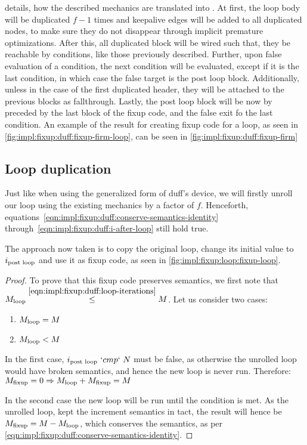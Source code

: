  details, how the described mechanics are translated into \libFIRM.
At first, the loop body will be duplicated $f - 1$ times and keepalive edges will be added to all duplicated nodes, to make sure they do not disappear through implicit premature optimizations.
After this, all duplicated block will be wired such that, they be reachable by conditions, like those previously described.
Further, upon false evaluation of a condition, the next condition will be evaluated, except if it is the last condition, in which case the false target is the post loop block.
Additionally, unless in the case of the first duplicated header, they will be attached to the previous blocks as fallthrough.
Lastly, the post loop block will be now by preceded by the last block of the fixup code, and the false exit fo the last condition.
An example of the result for creating fixup code for a loop, as seen in \cref{fig:impl:fixup:duff:fixup-firm-loop}, can be seen in \cref{fig:impl:fixup:duff:fixup-firm}







\subsection{Loop duplication}\label{sec:impl:fixup:loop}

Just like when using the generalized form of duff's device, we will firstly unroll our loop using the existing mechanics by a factor of $f$.
Henceforth, equations~\ref{eqn:impl:fixup:duff:conserve-semantics-identity} through~\ref{eqn:impl:fixup:duff:i-after-loop} still hold true.

The approach now taken is to copy the original loop, change its initial value to $i_\text{post loop}$ and use it as fixup code, as seen in \cref{fig:impl:fixup:loop:fixup-loop}.



\begin{proof}
    To prove that this fixup code preserves semantics, we first note that $M_{\text{loop}} \overset{\ref{eqn:impl:fixup:duff:loop-iterations}}{\leq} M$.
    Let us consider two cases:
    \begin{enumerate}
        \item $M_{\text{loop}} = M$
        \item $M_{\text{loop}} < M$
    \end{enumerate}
    In the first case, $i_\text{post loop}~`cmp`~N$ must be false, as otherwise the unrolled loop would have broken semantics, and hence the new loop is never run.
    Therefore: $M_{\text{fixup}} = 0 \Rightarrow M_{\text{loop}} + M_{\text{fixup}} = M$

    In the second case the new loop will be run until the condition is met.
    As the unrolled loop, kept the increment semantics in tact, the result will hence be $M_{\text{fixup}} = M - M_{\text{loop}}$, which conserves the semantics, as per \cref{eqn:impl:fixup:duff:conserve-semantics-identity}.
\end{proof}

